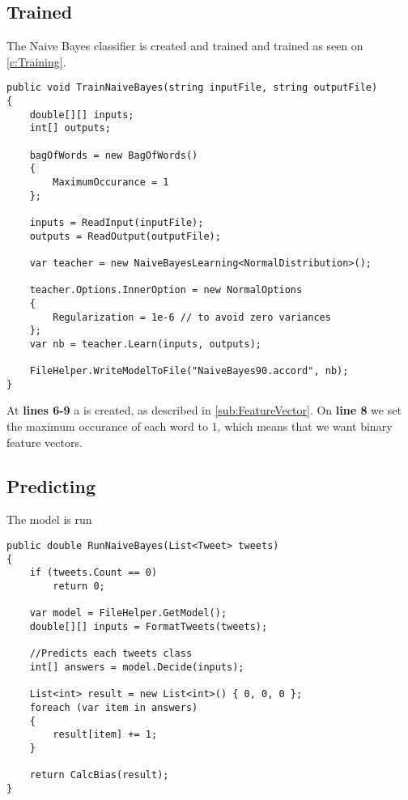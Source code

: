 \subsection{Trained}

The Naive Bayes classifier is created and trained and trained as seen on
\autoref{c:Training}.\nl

\begin{minipage}[H]{\linewidth}
\begin{lstlisting}[caption = Creating and training the classifier, label =
c:Training] 
public void TrainNaiveBayes(string inputFile, string outputFile)
{
    double[][] inputs;
    int[] outputs;

    bagOfWords = new BagOfWords()
    {
        MaximumOccurance = 1
    };

    inputs = ReadInput(inputFile);
    outputs = ReadOutput(outputFile);

    var teacher = new NaiveBayesLearning<NormalDistribution>();

    teacher.Options.InnerOption = new NormalOptions
    {
        Regularization = 1e-6 // to avoid zero variances
    };
    var nb = teacher.Learn(inputs, outputs);

    FileHelper.WriteModelToFile("NaiveBayes90.accord", nb);
}
\end{lstlisting}
\end{minipage}


At \textbf{lines 6-9} a  is created, as described in
\autoref{sub:FeatureVector}. On \textbf{line 8} we set the maximum occurance of
each word to 1, which means that we want binary feature vectors.







\subsection{Predicting}

The model is run 


\begin{minipage}[H]{\linewidth}
\begin{lstlisting}[caption = Load the Naive Bayes model and find
bias, label = c:Run] 
public double RunNaiveBayes(List<Tweet> tweets)
{
    if (tweets.Count == 0)
        return 0;

    var model = FileHelper.GetModel();
    double[][] inputs = FormatTweets(tweets);

    //Predicts each tweets class
    int[] answers = model.Decide(inputs);

    List<int> result = new List<int>() { 0, 0, 0 };
    foreach (var item in answers)
    {
        result[item] += 1;
    }

    return CalcBias(result);
}
\end{lstlisting}
\end{minipage}




